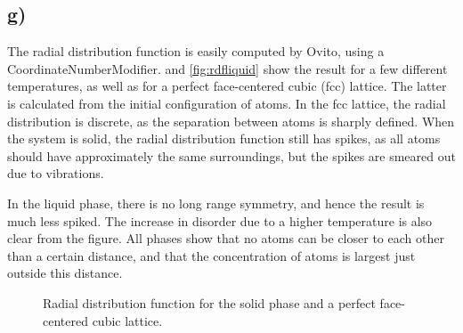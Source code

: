 \documentclass[11pt,british,a4paper]{report}
\begin{document}
\subsection*{g)}
The radial distribution function is easily computed by Ovito, using a CoordinateNumberModifier.  and \vref{fig:rdfliquid} show the result for a few different temperatures, as well as for a perfect face-centered cubic (fcc) lattice. The latter is calculated from the initial configuration of atoms. In the fcc lattice, the radial distribution is discrete, as the separation between atoms is sharply defined. When the system is solid, the radial distribution function still has spikes, as all atoms should have approximately the same surroundings, but the spikes are smeared out due to vibrations.

In the liquid phase, there is no long range symmetry, and hence the result is much less spiked. The increase in disorder due to a higher temperature is also clear from the figure. All phases show that no atoms can be closer to each other than a certain distance, and that the concentration of atoms is largest just outside this distance.
\begin{figure}[htbp]
    \centering
    \caption{Radial distribution function for the solid phase and a perfect face-centered cubic lattice.}%
    \label{fig:rdf}
\end{figure}
\end{document}

